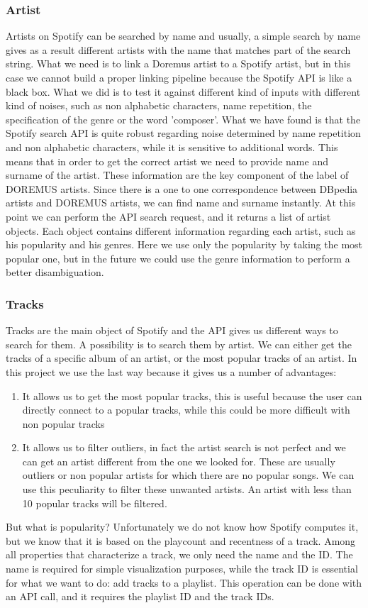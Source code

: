 \documentclass[paper=a4, fontsize=11pt]{scrartcl}
\begin{document}
\subsubsection{Artist}
Artists on Spotify can be searched by name and usually, a simple search by name gives as a result different artists with the name that matches part of the search string.
What we need is to link a Doremus artist to a Spotify artist, but in this case we cannot build a proper linking pipeline because the Spotify API is like a black box. What we did is to test it against different kind of inputs with different kind of noises, such as non alphabetic characters, name repetition, the specification of the genre or the word 'composer'. What we have found is that the Spotify search API is quite robust regarding noise determined by name repetition and non alphabetic characters, while it is sensitive to additional words. This means that in order to get the correct artist we need to provide name and surname of the artist. These information are the key component of the label of DOREMUS artists. Since there is a one to one correspondence between DBpedia artists and DOREMUS artists, we can find name and surname instantly. At this point we can perform the API search request, and it returns a list of artist objects. Each object contains different information regarding each artist, such as his popularity and his genres. Here we use only the popularity by taking the most popular one, but in the future we could use the genre information to perform a better disambiguation.

\subsubsection{Tracks}
Tracks are the main object of Spotify and the API gives us different ways to search for them. A possibility is to search them by artist. We can either get the tracks of a specific album of an artist, or the most popular tracks of an artist. In this project we use the last way because it gives us a number of advantages:
\begin{enumerate}
\item It allows us to get the most popular tracks, this is useful because the user can directly connect to a popular tracks, while this could be more difficult with non popular tracks
\item It allows us to filter outliers, in fact the artist search is not perfect and we can get an artist different from the one we looked for. These are usually outliers or non popular artists for which there are no popular songs. We can use this peculiarity to filter these unwanted artists. An artist with less than 10 popular tracks will be filtered.
\end{enumerate}
But what is popularity? Unfortunately we do not know how Spotify computes it, but we know that it is based on the playcount and recentness of a track.
Among all properties that characterize a track, we only need the name and the ID.
The name is required for simple visualization purposes, while the track ID is essential for what we want to do: add tracks to a playlist. This operation can be done with an API call, and it requires the playlist ID and the track IDs.
\end{document}
